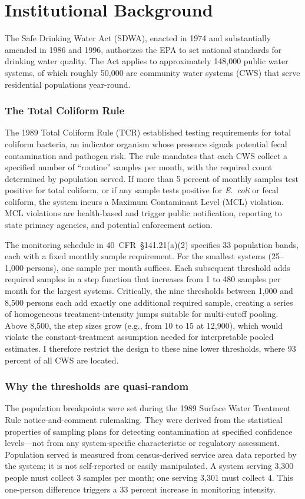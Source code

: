 \documentclass[12pt]{article}
\begin{document}
\section{Institutional Background}
\label{sec:background}

The Safe Drinking Water Act (SDWA), enacted in 1974 and substantially amended in 1986 and 1996, authorizes the EPA to set national standards for drinking water quality. The Act applies to approximately 148,000 public water systems, of which roughly 50,000 are community water systems (CWS) that serve residential populations year-round.

\subsubsection*{The Total Coliform Rule} The 1989 Total Coliform Rule (TCR) established testing requirements for total coliform bacteria, an indicator organism whose presence signals potential fecal contamination and pathogen risk. The rule mandates that each CWS collect a specified number of ``routine'' samples per month, with the required count determined by population served. If more than 5 percent of monthly samples test positive for total coliform, or if any sample tests positive for \textit{E.~coli} or fecal coliform, the system incurs a Maximum Contaminant Level (MCL) violation. MCL violations are health-based and trigger public notification, reporting to state primacy agencies, and potential enforcement action.

The monitoring schedule in 40~CFR~\S141.21(a)(2) specifies 33 population bands, each with a fixed monthly sample requirement. For the smallest systems (25--1,000 persons), one sample per month suffices. Each subsequent threshold adds required samples in a step function that increases from 1 to 480 samples per month for the largest systems. Critically, the nine thresholds between 1,000 and 8,500 persons each add exactly one additional required sample, creating a series of homogeneous treatment-intensity jumps suitable for multi-cutoff pooling. Above 8,500, the step sizes grow (e.g., from 10 to 15 at 12,900), which would violate the constant-treatment assumption needed for interpretable pooled estimates. I therefore restrict the design to these nine lower thresholds, where 93 percent of all CWS are located.

\subsubsection*{Why the thresholds are quasi-random} The population breakpoints were set during the 1989 Surface Water Treatment Rule notice-and-comment rulemaking. They were derived from the statistical properties of sampling plans for detecting contamination at specified confidence levels---not from any system-specific characteristic or regulatory assessment. Population served is measured from census-derived service area data reported by the system; it is not self-reported or easily manipulated. A system serving 3,300 people must collect 3 samples per month; one serving 3,301 must collect 4. This one-person difference triggers a 33 percent increase in monitoring intensity.
\end{document}
